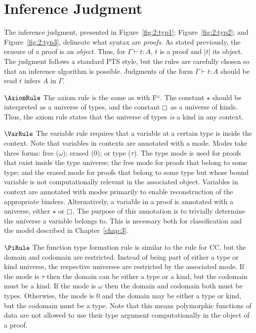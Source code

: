 \section{Inference Judgment}
\label{sec:2:judgments}


The inference judgment, presented in Figure~\ref{fig:2:typ1}; Figure~\ref{fig:2:typ2}; and Figure~\ref{fig:2:typ3}, delineate what syntax are \textit{proofs}.
As stated previously, the erasure of a proof is an \textit{object}.
Thus, for $\Gamma \vdash t : A$, $t$ is a proof and $|t|$ its object.
The judgment follows a standard PTS style, but the rules are carefully chosen so that an inference algorithm is possible.
Judgments of the form $\Gamma \vdash t : A$ should be read $t$ infers $A$ in $\Gamma$.

$\AxiomRule$ The axiom rule is the same as with F$^\omega$.
The constant $\star$ should be interpreted as a universe of types, and the constant $\kind$ as a universe of kinds.
Thus, the axiom rule states that the universe of types \textit{is} a kind in any context.

$\VarRule$ The variable rule requires that a variable at a certain type is inside the context.
Note that variables in contexts are annotated with a mode.
Modes take three forms: free ($\omega$); erased ($0$); or type ($\tau$).
The type mode is used for proofs that exist inside the type universe; the free mode for proofs that belong to some type; and the erased mode for proofs that belong to some type but whose bound variable is not computationally relevant in the associated object.
Variables in context are annotated with modes primarily to enable reconstruction of the appropriate binders.
Alternatively, a variable in a proof is annotated with a universe, either $\star$ or $\kind$.
The purpose of this annotation is to trivially determine the universe a variable belongs to.
This is necessary both for classification and the model described in Chapter~\ref{chap:3}.




$\PiRule$ The function type formation rule is similar to the rule for CC, but the domain and codomain are restricted.
Instead of being part of either a type or kind universe, the respective universes are restricted by the associated mode.
If the mode is $\tau$ then the domain can be either a type or a kind, but the codomain must be a kind.
If the mode is $\omega$ then the domain and codomain both must be types.
Otherwise, the mode is $0$ and the domain may be either a type or kind, but the codomain must be a type.
Note that this means polymorphic functions of data are not allowed to use their type argument computationally in the object of a proof.

